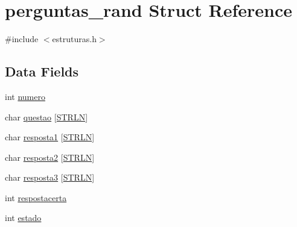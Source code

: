 \hypertarget{structperguntas__rand}{\section{perguntas\+\_\+rand Struct Reference}
\label{structperguntas__rand}
}


{\ttfamily \#include $<$estruturas.\+h$>$}

\subsection*{Data Fields}
\begin{DoxyCompactItemize}
\item 
int \hyperlink{structperguntas__rand_a2c30f43104974e72e2809fb4569804b0}{numero}
\item 
char \hyperlink{structperguntas__rand_a4b7dd32397590b4d045faed952f33751}{questao} \mbox{[}\hyperlink{includes__defines_8h_ac16126e1e860a5541e593e483710fa4e}{S\+T\+R\+L\+N}\mbox{]}
\item 
char \hyperlink{structperguntas__rand_aa8f0286ae319cff05e48f7336bcd05fe}{resposta1} \mbox{[}\hyperlink{includes__defines_8h_ac16126e1e860a5541e593e483710fa4e}{S\+T\+R\+L\+N}\mbox{]}
\item 
char \hyperlink{structperguntas__rand_a3d4fc0d13fd39fdac38050972b9d420f}{resposta2} \mbox{[}\hyperlink{includes__defines_8h_ac16126e1e860a5541e593e483710fa4e}{S\+T\+R\+L\+N}\mbox{]}
\item 
char \hyperlink{structperguntas__rand_a6489103c53562db7f0f8e86d47fe3b79}{resposta3} \mbox{[}\hyperlink{includes__defines_8h_ac16126e1e860a5541e593e483710fa4e}{S\+T\+R\+L\+N}\mbox{]}
\item 
int \hyperlink{structperguntas__rand_a3e23bda5c00103b6d418157ef2743768}{respostacerta}
\item 
int \hyperlink{structperguntas__rand_a876d08c1d21086e4fd228744da10d028}{estado}
\end{DoxyCompactItemize}


